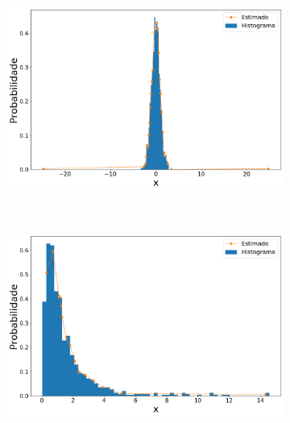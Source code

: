 \begin{figure}[H]
\begin{subfigure}[b]{0.45\textwidth}
		\caption{}
		\label{fig:ipdf1_norm15_data_out}
	\end{subfigure}
	\hfill
	\begin{subfigure}[b]{0.45\textwidth}
		\centering 
		\includegraphics[width=\linewidth]{./figuras/iPDF1_normal_25_1_1000_25}
		\caption{}
		\label{fig:ipdf1_norm25_data_out}
	\end{subfigure}
	\\
	\begin{subfigure}[b]{0.45\textwidth}
		\centering 
		\includegraphics[width=\linewidth]{./figuras/iPDF1_lognormal_15_1_1000_0}
		\caption{}
		\label{fig:ipdf1_lognorm15_data}
	\end{subfigure}
	\hfill
	\begin{subfigure}[b]{0.45\textwidth}
		\centering 

\end{subfigure}
\end{figure}
